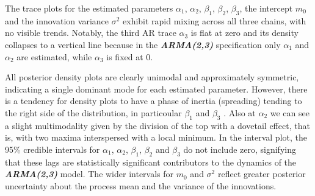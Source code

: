 \documentclass{Configuration_Files/PoliMi3i_thesis}
\begin{document}
\newpage  
The trace plots for the estimated parameters \(\alpha_1\), \(\alpha_2\), \(\beta_1\), \(\beta_2\), \(\beta_3\), the intercept \(m_0\) and the innovation variance \(\sigma^2\) exhibit rapid mixing across all three chains, with no visible trends. Notably, the third AR trace \(\alpha_3\) is flat at zero and its density collapses to a vertical line because in the \textbf{\textit{ARMA(2,3)}} specification only \(\alpha_1\) and \(\alpha_2\) are estimated, while \(\alpha_3\) is fixed at 0.


All posterior density plots are clearly unimodal and approximately symmetric, indicating a single dominant mode for each estimated parameter. However, there is a tendency for density plots to have a phase of inertia (spreading) tending to the right side of the distribution, in particoular \(\beta_1\) and \(\beta_3\) . Also at \(\alpha_2\) we can see a slight multimodality given by the division of the top with a dovetail effect, that is, with two maxima interspersed with a local minimum.  In the interval plot, the 95\% credible intervals for \(\alpha_1\), \(\alpha_2\), \(\beta_1\), \(\beta_2\) and \(\beta_3\) do not include zero, signifying that these lags are statistically significant contributors to the dynamics of the \textbf{\textit{ARMA(2,3)}} model. The wider intervals for \(m_0\) and \(\sigma^2\) reflect greater posterior uncertainty about the process mean and the variance of the innovations.


\newpage
\end{document}
